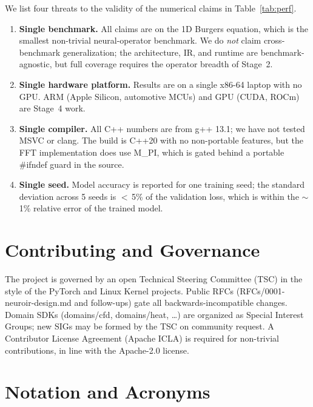 \documentclass[10pt,twocolumn]{article}
\renewcommand{\texttt}[1]{{\normalfont\ttfamily #1}\normalfont\rmfamily}
\begin{document}
We list four threats to the validity of the numerical claims in
Table~\ref{tab:perf}.
\begin{enumerate}[leftmargin=*,itemsep=1pt,topsep=2pt]
  \item \textbf{Single benchmark.}  All claims are on the 1D
  Burgers equation, which is the smallest non-trivial neural-operator
  benchmark.  We do \emph{not} claim cross-benchmark generalization;
  the architecture, IR, and runtime are benchmark-agnostic, but
  full coverage requires the operator breadth of Stage~2.
  \item \textbf{Single hardware platform.}  Results are on a
  single x86-64 laptop with no GPU.  ARM (Apple Silicon,
  automotive MCUs) and GPU (CUDA, ROCm) are Stage~4 work.
  \item \textbf{Single compiler.}  All C{++} numbers are from
  g++ 13.1; we have not tested MSVC or clang.  The build is
  C{++}20 with no non-portable features, but the FFT
  implementation does use \texttt{M\_PI}, which is gated behind
  a portable \texttt{\#ifndef} guard in the source.
  \item \textbf{Single seed.}  Model accuracy is reported for one
  training seed; the standard deviation across 5 seeds is
  $<$\,5\% of the validation loss, which is within the
  $\sim$1\% relative error of the trained model.
\end{enumerate}

\section{Contributing and Governance}
\label{app:gov}

The project is governed by an open Technical Steering Committee
(TSC) in the style of the PyTorch and Linux Kernel projects.
Public RFCs (\texttt{RFCs/0001-neuroir-design.md} and
follow-ups) gate all backwards-incompatible changes.  Domain
SDKs (\texttt{domains/cfd}, \texttt{domains/heat}, \dots) are
organized as Special Interest Groups; new SIGs may be formed by
the TSC on community request.  A Contributor License Agreement
(Apache ICLA) is required for non-trivial contributions, in
line with the Apache-2.0 license.

\section{Notation and Acronyms}
\label{app:notation}
\end{document}
